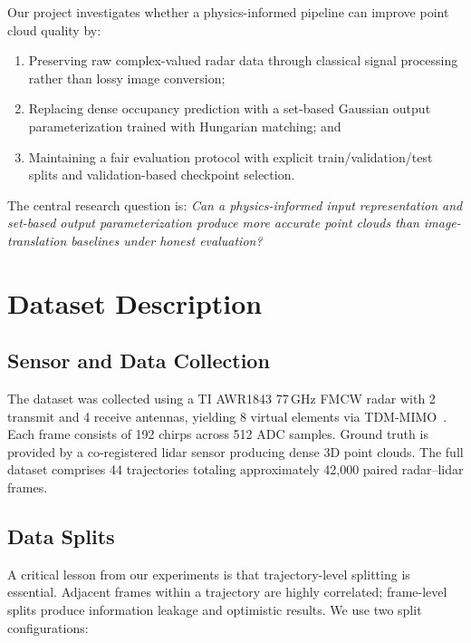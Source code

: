 \documentclass[conference]{IEEEtran}
\begin{document}
Our project investigates whether a physics-informed pipeline can improve point cloud quality by:
\begin{enumerate}
  \item Preserving raw complex-valued radar data through classical signal processing rather than lossy image conversion;
  \item Replacing dense occupancy prediction with a set-based Gaussian output parameterization trained with Hungarian matching; and
  \item Maintaining a fair evaluation protocol with explicit train/validation/test splits and validation-based checkpoint selection.
\end{enumerate}

The central research question is:
\emph{Can a physics-informed input representation and set-based output parameterization produce more accurate point clouds than image-translation baselines under honest evaluation?}

\section{Dataset Description}

\subsection{Sensor and Data Collection}

The dataset was collected using a TI AWR1843 77\,GHz FMCW radar with 2 transmit and 4 receive antennas, yielding 8 virtual elements via TDM-MIMO~\cite{prabhakara2023radarhd}.
Each frame consists of 192 chirps across 512 ADC samples.
Ground truth is provided by a co-registered lidar sensor producing dense 3D point clouds.
The full dataset comprises 44 trajectories totaling approximately 42,000 paired radar--lidar frames.

\subsection{Data Splits}

A critical lesson from our experiments is that trajectory-level splitting is essential.
Adjacent frames within a trajectory are highly correlated; frame-level splits produce information leakage and optimistic results.
We use two split configurations:
\end{document}
